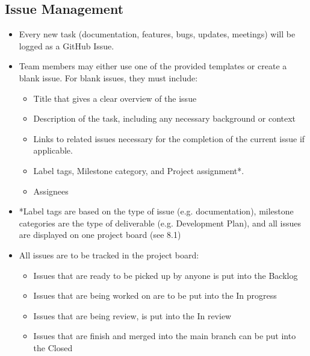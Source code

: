\documentclass{article}
\begin{document}
\subsection{Issue Management}
\begin{itemize}
	\item Every new task (documentation, features, bugs, updates, meetings) will be logged as a GitHub Issue.
	\item Team members may either use one of the provided templates or create a blank issue. For blank issues, 
  they must include:
	\begin{itemize}
    \item Title that gives a clear overview of the issue
    \item Description of the task, including any necessary background or context
    \item Links to related issues necessary for the completion of the current issue if applicable.
    \item Label tags, Milestone category, and Project assignment*.
    \item Assignees
  \end{itemize}
  \item *Label tags are based on the type of issue (e.g. documentation), milestone categories 
  are the type of deliverable (e.g. Development Plan), and all issues are displayed on one project board (see 8.1)
  \item All issues are to be tracked in the project board:
  \begin{itemize}
    \item Issues that are ready to be picked up by anyone is put into the Backlog
    \item Issues that are being worked on are to be put into the In progress
    \item Issues that are being review, is put into the In review
    \item Issues that are finish and merged into the main branch can be put into the Closed
  \end{itemize}
\end{itemize}
\end{document}
